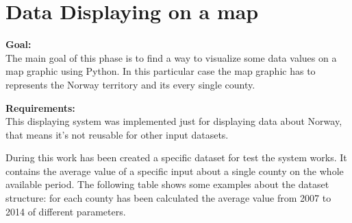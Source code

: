 \newpage

\section{Data Displaying on a map}
\label{Map_displaying}
\textbf{Goal:}\\
The main goal of this phase is to find a way to visualize some data values on a map graphic using Python. In this particular case the map graphic has to represents the Norway territory and its every single county.


\textbf{Requirements:}\\
This displaying system was implemented just for displaying data about Norway, that means it's not reusable for other input datasets.

During this work has been created a specific dataset for test the system works. It contains the average value of a specific input about a single county on the whole available period. The following table shows some examples about the dataset structure: for each county has been calculated the average value from 2007 to 2014 of different parameters.\\

\\
    

